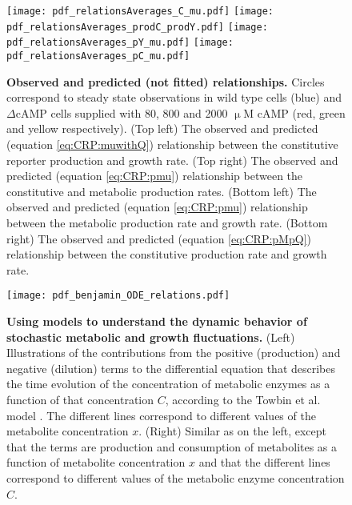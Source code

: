 \begin{figure}%
	\centering
	\texttt{[image: pdf\_relationsAverages\_C\_mu.pdf]}
	\texttt{[image: pdf\_relationsAverages\_prodC\_prodY.pdf]}	
	\texttt{[image: pdf\_relationsAverages\_pY\_mu.pdf]}
	\texttt{[image: pdf\_relationsAverages\_pC\_mu.pdf]}	
	\caption{ 
		\textbf{Observed and predicted (not fitted) relationships.}
		Circles correspond to steady state observations in wild type cells (blue) and $\Delta$cAMP cells supplied with 80, 800 and 2000 $\upmu$M cAMP (red, green and yellow respectively).
		(Top left) The observed and predicted (equation \ref{eq:CRP:muwithQ}) relationship between the constitutive reporter production and growth rate.
		(Top right) The observed and predicted (equation \ref{eq:CRP:pmu}) relationship between the constitutive and metabolic production rates.
		(Bottom left) The observed and predicted (equation \ref{eq:CRP:pmu}) relationship between the metabolic production rate and growth rate.
		(Bottom right) The observed and predicted (equation \ref{eq:CRP:pMpQ}) relationship between the constitutive production rate and growth rate.
	}
	\label{fig:CRP:averagerelations2}
\end{figure}%

\begin{figure}
	\centering
	\texttt{[image: pdf\_benjamin\_ODE\_relations.pdf]}
	\caption{ 
		\textbf{Using models to understand the dynamic behavior of stochastic metabolic and growth fluctuations.}
		(Left) Illustrations of the contributions from the positive (production) and negative (dilution) terms to the differential equation that describes the time evolution of the concentration of metabolic enzymes as a function of that concentration $C$, according to the Towbin et al. model \cite{Towbin2017}. The different lines correspond to different values of the metabolite concentration $x$. 
		(Right)	Similar as on the left, except that the terms are production and consumption of metabolites as a function of metabolite concentration $x$ and that the different lines correspond to different values of the metabolic enzyme concentration $C$.
	}
	\label{fig:CRP:benjamin_ODEs}
\end{figure}



